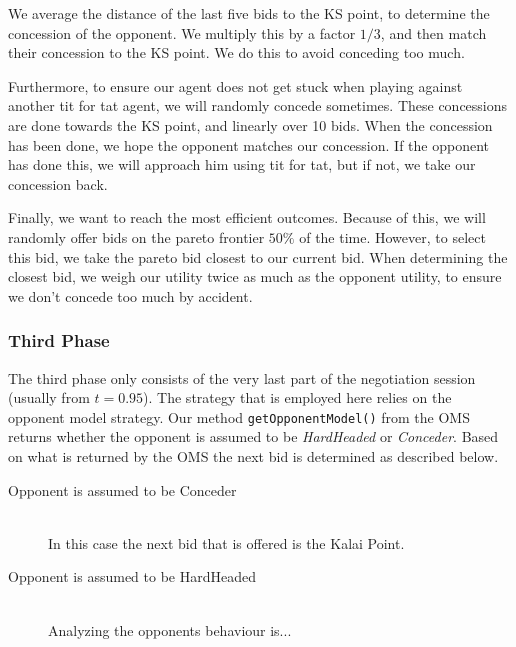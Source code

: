 We average the distance of the last five bids to the KS point,
to determine the concession of the opponent. We
multiply this by a factor $1/3$, and then match their concession to the KS point.
We do this to avoid conceding too much. 

Furthermore, to ensure our agent does not get stuck when playing against 
another tit for tat agent, we will randomly concede sometimes. 
These concessions are done towards the KS point, and linearly over 
10 bids. When the concession has been done, we hope the opponent matches 
our concession. If the opponent has done this, we will approach him
using tit for tat, but if not, we take our concession back.

Finally, we want to reach the most efficient outcomes. Because of this,
we will randomly offer bids on the pareto frontier $50 \%$ of the time.
However, to select this bid, we take the pareto bid closest to our current bid.
When determining the closest bid, we weigh our utility twice as much
as the opponent utility, to ensure we don't concede too much by accident.

\subsubsection{Third Phase}

The third phase only consists of the very last part of the negotiation session (usually from $t = 0.95$). The strategy that is employed here relies on the opponent model strategy. Our method \texttt{getOpponentModel()} from the OMS returns whether the opponent is assumed to be \emph{HardHeaded} or \emph{Conceder}. Based on what is returned by the OMS the next bid is determined as described below.

\begin{description}
  \item[Opponent is assumed to be Conceder] \hfill \\
  In this case the next bid that is offered is the Kalai Point.

  \item[Opponent is assumed to be HardHeaded] \hfill \\
  Analyzing the opponents behaviour is...
\end{description}

